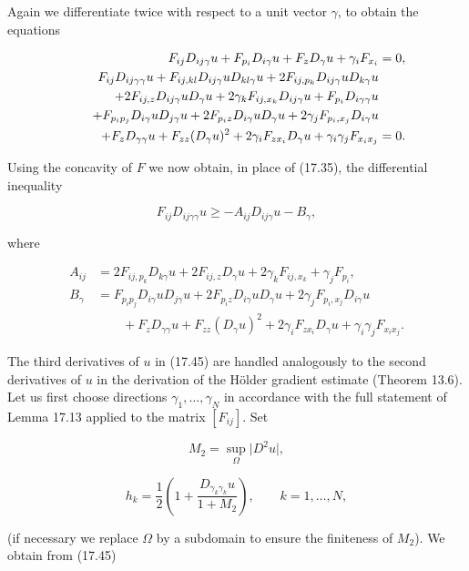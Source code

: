 Again we differentiate twice with respect to a unit vector $\gamma$, to obtain the equations

\begin{align}
F_{ij}D_{ij\gamma}u + F_{p_i}D_{i\gamma}u + F_zD_{\gamma}u + \gamma_iF_{x_i} &= 0, \\
F_{ij}D_{ij\gamma\gamma}u + F_{ij,kl}D_{ij\gamma}uD_{kl\gamma}u + 2F_{ij,p_k}D_{ij\gamma}uD_{k\gamma}u \notag \\
\qquad + 2F_{ij,z}D_{ij\gamma}uD_{\gamma}u + 2\gamma_kF_{ij,x_k}D_{ij\gamma}u + F_{p_i}D_{i\gamma\gamma}u \notag \\
\qquad + F_{p_ip_j}D_{i\gamma}uD_{j\gamma}u + 2F_{p_i z}D_{i\gamma}uD_{\gamma}u + 2\gamma_jF_{p_i,x_j}D_{i\gamma}u \notag \\
\qquad + F_zD_{\gamma\gamma}u + F_{zz}(D_{\gamma}u)^2 + 2\gamma_iF_{z x_i}D_{\gamma}u + \gamma_i\gamma_jF_{x_i x_j} &= 0.
\end{align}

Using the concavity of $F$ we now obtain, in place of (17.35), the differential inequality

\begin{equation}
F_{ij}D_{ij\gamma\gamma}u \geq -A_{ij}D_{ij\gamma}u - B_{\gamma},
\end{equation}

where

\begin{align*}
A_{ij} &= 2F_{ij,p_k}D_{k\gamma}u + 2F_{ij,z}D_{\gamma}u + 2\gamma_kF_{ij,x_k} + \gamma_jF_{p_i}, \\
B_{\gamma} &= F_{p_ip_j}D_{i\gamma}uD_{j\gamma}u + 2F_{p_i z}D_{i\gamma}uD_{\gamma}u + 2\gamma_jF_{p_i,x_j}D_{i\gamma}u \\
&\qquad + F_zD_{\gamma\gamma}u + F_{zz}(D_{\gamma}u)^2 + 2\gamma_iF_{z x_i}D_{\gamma}u + \gamma_i\gamma_jF_{x_i x_j}.
\end{align*}

The third derivatives of $u$ in (17.45) are handled analogously to the second derivatives of $u$ in the derivation of the Hölder gradient estimate (Theorem 13.6). Let us first choose directions $\gamma_1,\dots,\gamma_N$ in accordance with the full statement of Lemma 17.13 applied to the matrix $[F_{ij}]$. Set

\[
M_2 = \sup_{\Omega} \lvert D^2u\rvert,
\]

\[
h_k = \frac12\left(1 + \frac{D_{\gamma_k\gamma_k}u}{1+M_2}\right), \qquad k=1,\dots,N,
\]

(if necessary we replace $\Omega$ by a subdomain to ensure the finiteness of $M_2$). We obtain from (17.45)

